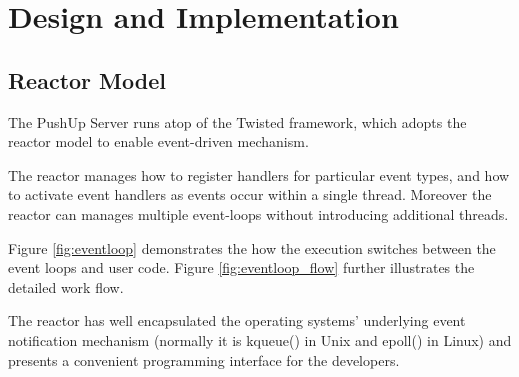 \section {Design and Implementation\\}

\subsection{Reactor Model\\}
The PushUp Server runs atop of the Twisted framework\cite{Twisted}, which 
adopts the reactor model\cite{Reactor} to enable event-driven mechanism.

The reactor manages how to register handlers for particular event types, and 
how to activate event handlers as events occur within a single thread. 
Moreover the reactor can manages multiple event-loops without introducing 
additional threads. 

Figure \ref{fig:eventloop} demonstrates the how the execution switches
between the event loops and user code. Figure \ref{fig:eventloop_flow} 
further illustrates the detailed work flow.

The reactor has well encapsulated the operating systems' underlying 
event notification mechanism (normally it is kqueue() in Unix and 
epoll() in Linux) and presents a convenient programming interface
for the developers.

